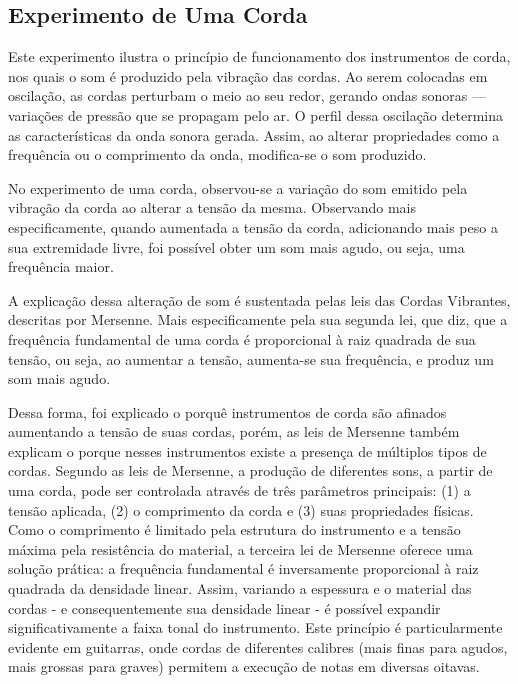 \subsection{Experimento de Uma Corda}
Este experimento ilustra o princípio de funcionamento dos instrumentos de corda, nos quais o som é produzido pela vibração das cordas. Ao serem colocadas em oscilação, as cordas perturbam o meio ao seu redor, gerando ondas sonoras — variações de pressão que se propagam pelo ar. O perfil dessa oscilação determina as características da onda sonora gerada. Assim, ao alterar propriedades como a frequência ou o comprimento da onda, modifica-se o som produzido.

No experimento de uma corda, observou-se a variação do som emitido pela vibração da corda ao alterar a tensão da mesma. Observando mais especificamente, quando aumentada a tensão da corda, adicionando mais peso a sua extremidade livre, foi possível obter um som mais agudo, ou seja, uma frequência maior.

A explicação dessa alteração de som é sustentada pelas leis das Cordas Vibrantes, descritas por Mersenne. Mais especificamente pela sua segunda lei, que diz, que a frequência fundamental de uma corda é proporcional à raiz quadrada de sua tensão, ou seja, ao aumentar a tensão, aumenta-se sua frequência, e produz um som mais agudo. 

Dessa forma, foi explicado o porquê instrumentos de corda são afinados aumentando a tensão de suas cordas, porém, as leis de Mersenne também explicam o porque nesses instrumentos existe a presença de múltiplos tipos de cordas. Segundo as leis de Mersenne, a produção de diferentes sons, a partir de uma corda, pode ser controlada através de três parâmetros principais: (1) a tensão aplicada, (2) o comprimento da corda e (3) suas propriedades físicas. Como o comprimento é limitado pela estrutura do instrumento e a tensão máxima pela resistência do material, a terceira lei de Mersenne oferece uma solução prática: a frequência fundamental é inversamente proporcional à raiz quadrada da densidade linear. Assim, variando a espessura e o material das cordas - e consequentemente sua densidade linear - é possível expandir significativamente a faixa tonal do instrumento. Este princípio é particularmente evidente em guitarras, onde cordas de diferentes calibres (mais finas para agudos, mais grossas para graves) permitem a execução de notas em diversas oitavas.


